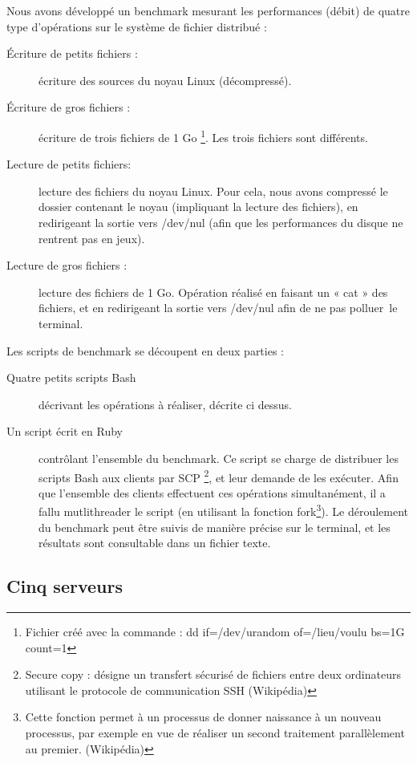\documentclass[12pt]{report}
\begin{document}
			Nous avons développé un benchmark mesurant les performances (débit) de quatre type d'opérations sur le système de fichier distribué :
			\begin{description}
				\item[Écriture de petits fichiers :] écriture des sources du noyau Linux (décompressé).
				\item[Écriture de gros fichiers :] écriture de trois fichiers de 1 Go
				\footnote{Fichier créé avec la commande : dd if=/dev/urandom of=/lieu/voulu bs=1G count=1}. Les trois fichiers sont différents.
				\item[Lecture de petits fichiers: ] lecture des fichiers du noyau Linux.
				Pour cela, nous avons compressé le dossier contenant le noyau (impliquant la lecture des fichiers),
				en redirigeant la sortie vers /dev/nul (afin que les performances du disque ne rentrent pas en jeux).
				\item[Lecture de gros fichiers :] lecture des fichiers de 1 Go. Opération réalisé en faisant un « cat » des fichiers,
				et en redirigeant la sortie vers /dev/nul afin de ne pas \og polluer\fg~le terminal.\\
			\end{description}

			Les scripts de benchmark se découpent en deux parties :
			\begin{description}
				\item[Quatre petits scripts Bash]décrivant les opérations à réaliser, décrite ci dessus.
				\item[Un script écrit en Ruby] contrôlant l'ensemble du benchmark.
				Ce script se charge de distribuer les scripts Bash aux clients par SCP
				\footnote{Secure copy : désigne un transfert sécurisé de fichiers entre deux ordinateurs utilisant le protocole de communication SSH (Wikipédia)},
				et leur demande de les exécuter. Afin que l'ensemble des clients effectuent ces opérations simultanément, il a fallu mutlithreader le script
				(en utilisant la fonction fork\footnote{Cette fonction permet à un processus de donner naissance à un nouveau processus,
				par exemple en vue de réaliser un second traitement parallèlement au premier. (Wikipédia)}).
				Le déroulement du benchmark peut être suivis de manière précise sur le terminal, et les résultats sont consultable dans un fichier texte.
			\end{description}

			\subsection{Cinq serveurs}
\end{document}
